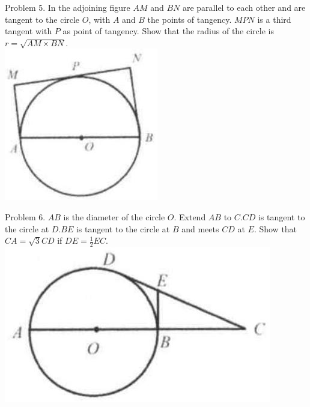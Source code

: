 \documentclass[10pt]{article}
\begin{document}
Problem 5. In the adjoining figure \(A M\) and \(B N\) are parallel to each other and are tangent to the circle \(O\), with \(A\) and \(B\) the points of tangency. \(M P N\) is a third tangent with \(P\) as point of tangency. Show that the radius of the circle is \(r=\sqrt{A M \times B N}\).\\
\includegraphics[max width=\textwidth, center]{2025_04_17_97bc1f7e44d93c271a88g-155(1)}

Problem 6. \(A B\) is the diameter of the circle \(O\). Extend \(A B\) to \(C . C D\) is tangent to the circle at \(D . B E\) is tangent to the circle at \(B\) and meets \(C D\) at \(E\). Show that \(C A=\sqrt{3} C D\) if \(D E=\frac{1}{2} E C\).\\
\includegraphics[max width=\textwidth, center]{2025_04_17_97bc1f7e44d93c271a88g-155(2)}
\end{document}
